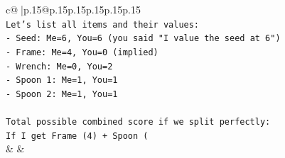 \documentclass{article}
\begin{document}
{\begin{supertabular}{c@{$\;$}|p{.15\linewidth}@{}p{.15\linewidth}p{.15\linewidth}p{.15\linewidth}p{.15\linewidth}p{.15\linewidth}}
{{{\\ 
\texttt{Let's list all items and their values:} \\
\texttt{{-} Seed: Me=6, You=6 (you said "I value the seed at 6")} \\
\texttt{{-} Frame: Me=4, You=0 (implied)} \\
\texttt{{-} Wrench: Me=0, You=2} \\
\texttt{{-} Spoon 1: Me=1, You=1} \\
\texttt{{-} Spoon 2: Me=1, You=1} \\
\\ 
\texttt{Total possible combined score if we split perfectly:} \\
\texttt{If I get Frame (4) + Spoon (} \\
            }
        }
    }
    & & \\ \\


\end{supertabular}}
\end{document}
